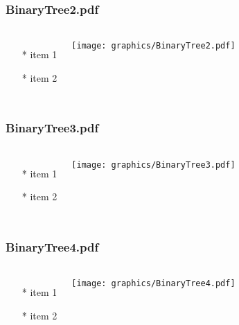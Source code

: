 \begin{frame} \frametitle{BinaryTree2.pdf}
    \begin{columns}[c]
        \begin{itemize}
            \item[*] item 1
            \item[*] item 2
        \end{itemize}
        \begin{minipage}{\linewidth}
            \begin{center}
            \texttt{[image: graphics/BinaryTree2.pdf]}
            \label{gfx:BinaryTree2.pdf}
            \end{center}
        \end{minipage}
    \end{columns}
\end{frame}
\begin{frame} \frametitle{BinaryTree3.pdf}
    \begin{columns}[c]
        \begin{itemize}
            \item[*] item 1
            \item[*] item 2
        \end{itemize}
        \begin{minipage}{\linewidth}
            \begin{center}
            \texttt{[image: graphics/BinaryTree3.pdf]}
            \label{gfx:BinaryTree3.pdf}
            \end{center}
        \end{minipage}
    \end{columns}
\end{frame}
\begin{frame} \frametitle{BinaryTree4.pdf}
    \begin{columns}[c]
        \begin{itemize}
            \item[*] item 1
            \item[*] item 2
        \end{itemize}
        \begin{minipage}{\linewidth}
            \begin{center}
            \texttt{[image: graphics/BinaryTree4.pdf]}
            \label{gfx:BinaryTree4.pdf}
            \end{center}
        \end{minipage}
    \end{columns}
\end{frame}
